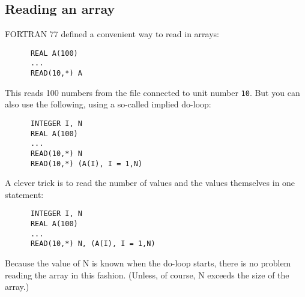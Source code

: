 \subsection{Reading an array}
FORTRAN 77 defined a convenient way to read in arrays:
%
\begin{verbatim}
      REAL A(100)
      ...
      READ(10,*) A
\end{verbatim}
%
This reads 100 numbers from the file connected to unit number \verb+10+. But you can
also use the following, using a so-called implied do-loop:
%
\begin{verbatim}
      INTEGER I, N
      REAL A(100)
      ...
      READ(10,*) N
      READ(10,*) (A(I), I = 1,N)
\end{verbatim}
%
A clever trick is to read the number of values and the values themselves in one statement:
%
\begin{verbatim}
      INTEGER I, N
      REAL A(100)
      ...
      READ(10,*) N, (A(I), I = 1,N)
\end{verbatim}
%
Because the value of N is known when the do-loop starts, there is no problem reading
the array in this fashion. (Unless, of course, N exceeds the size of the array.)
